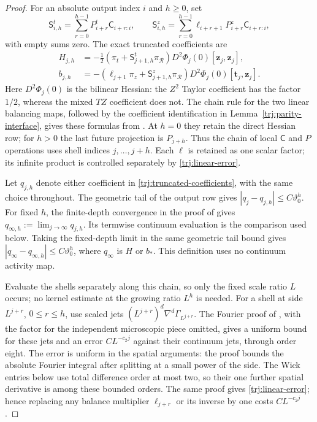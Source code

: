 \begin{proof}
For an absolute output index \(i\) and \(h\ge0\), set
\begin{equation}\label{trj:truncated-balance}
 \mathsf S^t_{i,h}=\sum_{r=0}^{h-1}P^t_{i+r}\mathsf C_{i+r:i},
 \qquad
 \mathsf S^z_{i,h}=\sum_{r=0}^{h-1}
            \ell_{i+r+1}P^z_{i+r}\mathsf C_{i+r:i},
\end{equation}
with empty sums zero.  The exact truncated coefficients are
\begin{equation}\label{trj:truncated-coefficients}
 \begin{split}
 H_{j,h}
  &=-\tfrac12(\pi_t+\mathsf S^t_{j+1,h}\pi_{\mathcal R})
       D^2\Phi_j(0)[\mathbf z_j,\mathbf z_j],\\
 b_{j,h}
  &=-(\ell_{j+1}\pi_z+\mathsf S^z_{j+1,h}\pi_{\mathcal R})
       D^2\Phi_j(0)[\mathbf t_j,\mathbf z_j].
 \end{split}
\end{equation}
Here \(D^2\Phi_j(0)\) is the bilinear Hessian: the \(Z^2\) Taylor
coefficient has the factor \(1/2\), whereas the mixed \(TZ\) coefficient
does not.  The chain rule for the two linear balancing maps, followed
by the coefficient identification in Lemma~\ref{trj:parity-interface},
gives these formulas from \cite[Proposition~8.5]{B}.  At \(h=0\) they
retain the direct Hessian row; for \(h>0\) the last future projection
is \(P_{j+h}\).  Thus the chain of local \(\mathsf C\) and \(P\)
operations uses shell indices \(j,\ldots,j+h\).  Each \(\ell\) is
retained as one scalar factor; its infinite product is controlled
separately by \eqref{trj:linear-error}.

Let \(q_{j,h}\) denote either coefficient in
\eqref{trj:truncated-coefficients}, with the same choice throughout.
The geometric tail of the output row gives
\(|q_j-q_{j,h}|\le C\vartheta_0^h\).  For fixed \(h\), the finite-depth
convergence in the proof of \cite[Proposition~8.5]{B} gives
\(q_{\infty,h}:=\lim_{j\to\infty}q_{j,h}\).  Its termwise continuum
evaluation is the comparison used below.  Taking the fixed-depth limit
in the same geometric tail bound gives
\(|q_\infty-q_{\infty,h}|\le C\vartheta_0^h\), where \(q_\infty\) is
\(H\) or \(b_*\).  This definition uses no continuum activity map.

Evaluate the shells separately along this chain, so
only the fixed scale ratio \(L\) occurs; no kernel estimate at the
growing ratio \(L^h\) is needed.  For a shell at side \(L^{j+r}\),
\(0\le r\le h\), use scaled jets
\((L^{j+r})^d\nabla^d\Gamma_{L^{j+r}}\).  The Fourier proof of
\cite[Lemma~8.1]{B}, with the factor for the independent microscopic
piece omitted, gives a uniform bound for these jets and an error
\(CL^{-c_2j}\) against their continuum jets, through order eight.
The error is uniform in the spatial arguments: the proof bounds the
absolute Fourier integral after splitting at a small power of the
side.  The Wick entries below use total difference order at most two,
so their one further spatial derivative is among these bounded orders.
The same proof gives \eqref{trj:linear-error}; hence
replacing any balance multiplier \(\ell_{j+r}\) or its inverse by one costs
\(CL^{-c_2j}\).


\end{proof}
